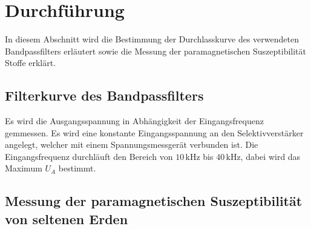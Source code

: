\section{Durchführung}
\label{sec:Durchführung}
In diesem Abschnitt wird die Bestimmung der Durchlasskurve des verwendeten Bandpassfilters erläutert sowie die Messung der paramagnetischen Suszeptibilität Stoffe erklärt.

\subsection{Filterkurve des Bandpassfilters}
Es wird die Ausgangsspannung in Abhängigkeit der Eingangsfrequenz gemmessen. Es wird eine konstante Eingangsspannung an den Selektivverstärker angelegt, welcher mit einem Spannungsmessgerät verbunden ist. 
Die Eingangsfrequenz durchläuft den Bereich von $ 10 \, \unit{\kilo\hertz}$ bis $40 \, \unit{\kilo\hertz}$, dabei wird das Maximum $ U_{A} $ bestimmt.


\subsection{Messung der paramagnetischen Suszeptibilität von seltenen Erden}